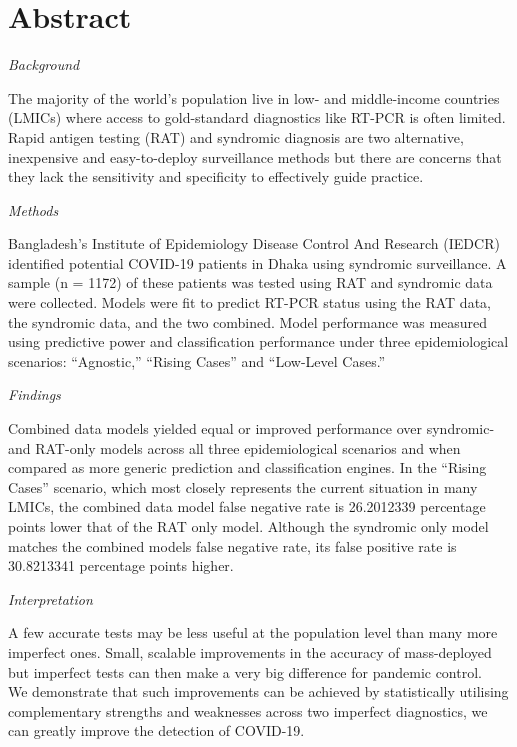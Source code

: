 \documentclass[]{elsarticle} %
\begin{document}
\hypertarget{abstract}{%
\section{Abstract}\label{abstract}}

\emph{Background}

The majority of the world's population live in low- and middle-income countries (LMICs) where access to gold-standard diagnostics like RT-PCR is often limited.
Rapid antigen testing (RAT) and syndromic diagnosis are two alternative, inexpensive and easy-to-deploy surveillance methods but there are concerns that they lack the sensitivity and specificity to effectively guide practice.

\emph{Methods}

Bangladesh's Institute of Epidemiology Disease Control And Research (IEDCR) identified potential COVID-19 patients in Dhaka using syndromic surveillance.
A sample (n = 1172) of these patients was tested using RAT and syndromic data were collected.
Models were fit to predict RT-PCR status using the RAT data, the syndromic data, and the two combined.
Model performance was measured using predictive power and classification performance under three epidemiological scenarios: ``Agnostic,'' ``Rising Cases'' and ``Low-Level Cases.''

\emph{Findings}

Combined data models yielded equal or improved performance over syndromic- and RAT-only models across all three epidemiological scenarios and when compared as more generic prediction and classification engines.
In the ``Rising Cases'' scenario, which most closely represents the current situation in many LMICs, the combined data model false negative rate is 26.2012339 percentage points lower that of the RAT only model.
Although the syndromic only model matches the combined models false negative rate, its false positive rate is 30.8213341 percentage points higher.

\emph{Interpretation}

A few accurate tests may be less useful at the population level than many more imperfect ones.
Small, scalable improvements in the accuracy of mass-deployed but imperfect tests can then make a very big difference for pandemic control.\\
We demonstrate that such improvements can be achieved by statistically utilising complementary strengths and weaknesses across two imperfect diagnostics, we can greatly improve the detection of COVID-19.
\end{document}
